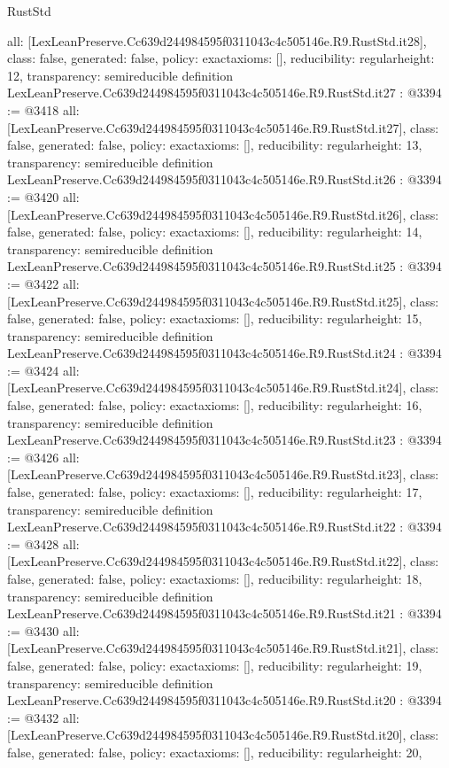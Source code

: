 \begin{lexlean}{RustStd}
\begin{coremodule}
{  all: [LexLeanPreserve.Cc639d244984595f0311043c4c505146e.R9.RustStd.it28],
  class: false,
  generated: false,
  policy: exact{axioms: []},
  reducibility: regular{height: 12},
  transparency: semireducible
}
definition LexLeanPreserve.Cc639d244984595f0311043c4c505146e.R9.RustStd.it27 : @3394 := @3418 {
  all: [LexLeanPreserve.Cc639d244984595f0311043c4c505146e.R9.RustStd.it27],
  class: false,
  generated: false,
  policy: exact{axioms: []},
  reducibility: regular{height: 13},
  transparency: semireducible
}
definition LexLeanPreserve.Cc639d244984595f0311043c4c505146e.R9.RustStd.it26 : @3394 := @3420 {
  all: [LexLeanPreserve.Cc639d244984595f0311043c4c505146e.R9.RustStd.it26],
  class: false,
  generated: false,
  policy: exact{axioms: []},
  reducibility: regular{height: 14},
  transparency: semireducible
}
definition LexLeanPreserve.Cc639d244984595f0311043c4c505146e.R9.RustStd.it25 : @3394 := @3422 {
  all: [LexLeanPreserve.Cc639d244984595f0311043c4c505146e.R9.RustStd.it25],
  class: false,
  generated: false,
  policy: exact{axioms: []},
  reducibility: regular{height: 15},
  transparency: semireducible
}
definition LexLeanPreserve.Cc639d244984595f0311043c4c505146e.R9.RustStd.it24 : @3394 := @3424 {
  all: [LexLeanPreserve.Cc639d244984595f0311043c4c505146e.R9.RustStd.it24],
  class: false,
  generated: false,
  policy: exact{axioms: []},
  reducibility: regular{height: 16},
  transparency: semireducible
}
definition LexLeanPreserve.Cc639d244984595f0311043c4c505146e.R9.RustStd.it23 : @3394 := @3426 {
  all: [LexLeanPreserve.Cc639d244984595f0311043c4c505146e.R9.RustStd.it23],
  class: false,
  generated: false,
  policy: exact{axioms: []},
  reducibility: regular{height: 17},
  transparency: semireducible
}
definition LexLeanPreserve.Cc639d244984595f0311043c4c505146e.R9.RustStd.it22 : @3394 := @3428 {
  all: [LexLeanPreserve.Cc639d244984595f0311043c4c505146e.R9.RustStd.it22],
  class: false,
  generated: false,
  policy: exact{axioms: []},
  reducibility: regular{height: 18},
  transparency: semireducible
}
definition LexLeanPreserve.Cc639d244984595f0311043c4c505146e.R9.RustStd.it21 : @3394 := @3430 {
  all: [LexLeanPreserve.Cc639d244984595f0311043c4c505146e.R9.RustStd.it21],
  class: false,
  generated: false,
  policy: exact{axioms: []},
  reducibility: regular{height: 19},
  transparency: semireducible
}
definition LexLeanPreserve.Cc639d244984595f0311043c4c505146e.R9.RustStd.it20 : @3394 := @3432 {
  all: [LexLeanPreserve.Cc639d244984595f0311043c4c505146e.R9.RustStd.it20],
  class: false,
  generated: false,
  policy: exact{axioms: []},
  reducibility: regular{height: 20},
}
\end{coremodule}
\end{lexlean}
